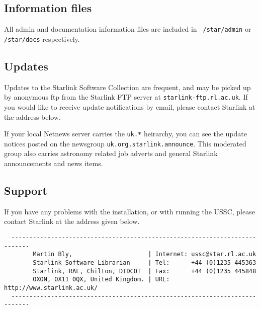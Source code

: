\subsection{Information files}
\label{s:info:files}

All admin and documentation information files are included in {\tt
/star/admin} or {\tt /star/docs} respectively.

\subsection{Updates}
\label{s:info:updates}

Updates to the Starlink Software Collection are frequent, and may be
picked up by anonymous ftp from the Starlink FTP server at
{\tt starlink-ftp.rl.ac.uk}.  If you would like to receive update
notifications by email, please contact Starlink at the address below.

If your local Netnews server carries the {\tt uk.*} heirarchy, you can
see the update notices posted on the newsgroup {\tt uk.org.starlink.announce}.
This moderated group also carries astronomy related job adverts and
general Starlink announcements and news items.

\subsection{Support}
\label{s:info:help}

If you have any problems with the installation, or with running the
USSC, please contact Starlink at the address given below.

\begin{verbatim}
  ---------------------------------------------------------------------------
        Martin Bly,                     | Internet: ussc@star.rl.ac.uk
        Starlink Software Librarian     | Tel:      +44 (0)1235 445363
        Starlink, RAL, Chilton, DIDCOT  | Fax:      +44 (0)1235 445848
        OXON, OX11 0QX, United Kingdom. | URL:  http://www.starlink.ac.uk/
  ---------------------------------------------------------------------------
\end{verbatim}


